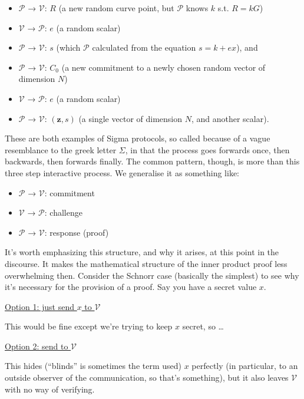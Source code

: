 \documentclass[10pt,a4paper]{article}
\begin{document}
\begin{itemize}
\item $\mathcal{P}$ → $\mathcal{V}$: $R$ (a new random curve point, but $\mathcal{P}$ knows $k$ s.t. $R=kG$)
\item $\mathcal{V}$ → $\mathcal{P}$: $e$ (a random scalar)
\item $\mathcal{P}$ → $\mathcal{V}$: $s$ (which $\mathcal{P}$ calculated from the equation $s=k+ex$), and
\item $\mathcal{P}$ → $\mathcal{V}$: $C_0$ (a new commitment to a newly chosen random vector of dimension $N$)
\item $\mathcal{V}$ → $\mathcal{P}$: $e$ (a random scalar)
\item $\mathcal{P}$ → $\mathcal{V}$: $(\mathbf{z}, s)$ (a single vector of dimension $N$, and another scalar). 
\end{itemize}

These are both examples of Sigma
protocols, so called because of a vague resemblance to the greek letter
$\Sigma$, in that the process goes forwards once, then backwards, then forwards
finally. The common pattern, though, is more than this three step
interactive process. We generalise it as something like:

\begin{itemize}
\item $\mathcal{P}$ → $\mathcal{V}$: commitment
\item $\mathcal{V}$ → $\mathcal{P}$: challenge
\item $\mathcal{P}$ → $\mathcal{V}$: response (proof)
\end{itemize}

It's worth emphasizing this structure, and why it arises, at this point
in the discourse. It makes the mathematical structure of the inner product
proof less overwhelming then. Consider the Schnorr case (basically the
simplest) to see why it's necessary for the provision of a proof. Say
you have a secret value $x$.

\underline{Option 1: just send $x$ to $\mathcal{V}$}

This would be fine except we're trying to keep $x$ secret, so \ldots{}

\underline{Option 2: send to $\mathcal{V}$}

This hides (``blinds'' is sometimes the term used) $x$ perfectly (in
particular, to an outside observer of the communication, so that's
something), but it also leaves $\mathcal{V}$ with no way of verifying.
\end{document}

